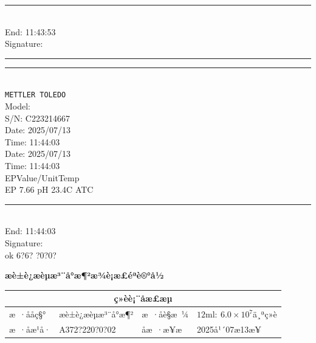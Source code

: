 \documentclass[UTF8,10pt,a4paper,fontset=fandol]{ctexart}
\newcommand{\fieldvalue}[1]{#1}
\newcommand{\handwritten}[1]{#1}
\begin{document}
\begin{center}
\begin{minipage}{0.32\textwidth}
\noindent\rule{\linewidth}{0.2pt}\\[-0.2em]
End:
\fieldvalue{11:43:53}\\
Signature: \\
\rule{\linewidth}{0.2pt}

\vspace{1em}
\noindent\rule{\linewidth}{0.2pt}\\[-0.2em]
\texttt{METTLER TOLEDO}\\
Model: \\
S/N:
\fieldvalue{C223214667}\\
Date:
\fieldvalue{2025/07/13}\\
Time:
\fieldvalue{11:44:03}\\[0.5em]

Date:
\fieldvalue{2025/07/13}\\
Time:
\fieldvalue{11:44:03}\\
EP\quad Value/Unit\quad Temp\\
EP
\fieldvalue{7.66 pH}
\quad
\fieldvalue{23.4\textdegree C ATC}\\[0.5em]

\noindent\rule{\linewidth}{0.2pt}\\[-0.2em]
End:
\fieldvalue{11:44:03}\\
Signature: \\
\fieldvalue{\handwritten{ok 6?6? ?0?0?}}
\end{minipage}
\end{center}

\newpage

\begin{center}
\textbf{æè±è¿æèµæ³¨å°æ¶²æ¾è¡æ£éªè®°å½}
\end{center}

\begin{center}
\begin{tabularx}{\textwidth}{|p{}|X|p{}|X|}
\hline
\multicolumn{4}{|c|}{ç»èè¡¨åæ£æµ} \\ \hline
æ ·ååç§° & æè±è¿æèµæ³¨å°æ¶² & æ ·åè§æ ¼ & $12\mathrm{ml}:~6.0\times10^7$ä¸ªç»è \\ \hline
æ ·åæ¹å· &
\fieldvalue{\handwritten{A372?220?0?02}} &
åæ ·æ¥æ &
\fieldvalue{\handwritten{2025å¹´07æ13æ¥}} \\ \hline
\end{tabularx}
\end{center}
\end{document}
